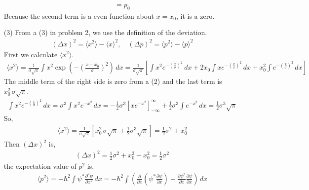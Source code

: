 \documentclass[aps,floatfix,nofootinbib,superscriptaddress,fleqn]{revtex4}
\begin{document}
\begin{itemize}
\begin{align}
                     = p_0    
\end{align}
Because the second term is a even function about $x=x_0$, it is a zero.
    \item[(3)] From a (3) in problem 2, we use the definition of the deviation.
    \begin{align}
      {(\Delta x)}^2 = \langle x^2\rangle - \langle x\rangle^2 ,\quad {(\Delta p)}^2 = \langle p^2\rangle - \langle p\rangle^2 
    \end{align}
    First we calculate $\langle x^2\rangle$.
    \begin{align}
      \langle x^2\rangle = \frac{1}{\sigma\sqrt{\pi}}\int x^2 \exp\left(-{\left( \frac{x-x_0}{\sigma} \right)}^2\right)\,dx
                        = \frac{1}{\sigma\sqrt{\pi}}\left[\int x^2 e^{-{\left( \frac{x}{\sigma} \right)}^2}\,dx
                                                        +2x_0\int xe^{-{\left( \frac{x}{\sigma} \right)}^2}\,dx
                                                        +x^2_0\int e^{-{\left( \frac{x}{\sigma} \right)}^2}\,dx\right]
    \end{align}
    The middle term of the right side is zero from a (2) and the last term is $x^2_0\,\sigma\sqrt{\pi}$.
    \begin{align}
      \int x^2 e^{-{\left( \frac{x}{\sigma} \right)}^2}\,dx = \sigma^3\int x^2 e^{-x^2}\,dx 
                                                            = -\frac{1}{2}\sigma^3{\left[xe^{-x^2}\right]}^{\infty}_{-\infty}
                                                              +\frac{1}{2}\sigma^3\int e^{-x^2}\,dx
                                                            = \frac{1}{2}\sigma^3\sqrt{\pi}
    \end{align}
    So,
    \begin{align}
      \langle x^2 \rangle = \frac{1}{\sigma\sqrt{\pi}}\left[ x^2_0\,\sigma\sqrt{\pi}
                            + \frac{1}{2}\sigma^3\sqrt{\pi} \right]
                          = \frac{1}{2}\sigma^2+x_0^2
    \end{align}
    Then $\left(\Delta x\right)^2$ is,
    \begin{align}
      \left(\Delta x\right)^2 = \frac{1}{2}\sigma^2+x_0^2 - x_0^2 = \frac{1}{2}\sigma^2
    \end{align}
the expectation value of $p^2$ is,
\begin{align}
  \langle p^2 \rangle = -\hbar^2 \int \psi^* \frac{\partial^2 \psi}{\partial x^2}\,dx 
  = -\hbar^2\int \left(\frac{\partial}{\partial x} \left(\psi^* \frac{\partial \psi}{\partial x}\right) - \frac{\partial \psi^*}{\partial x}\frac{\partial \psi}{\partial x}\right)\,dx

\end{align}
\end{itemize}
\end{document}

